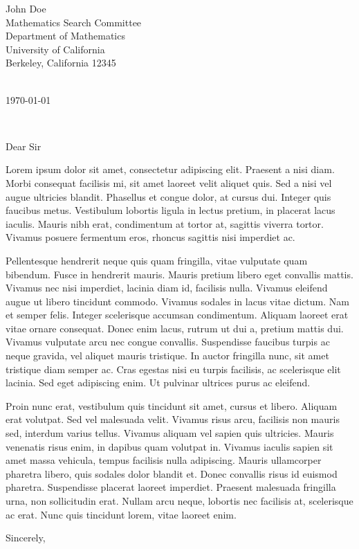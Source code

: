 \documentclass[11pt,a4paper]{letter}
\def\opening#1{\thispagestyle{empty}
{\centering\fromaddress \vspace{0.6in} \\ 
\hspace*{\longindentation}\today\hspace*{\fill}\par} 
{\raggedright \toname \\ \toaddress \par} 
\vspace{0.4in} 
\noindent #1 
}
\begin{document}

\begin{letter}
{John Doe\\
Mathematics Search Committee\\
Department of Mathematics\\
University of California\\
Berkeley, California 12345\\
}


\opening{Dear Sir}

Lorem ipsum dolor sit amet, consectetur adipiscing elit. Praesent a nisi diam. Morbi consequat facilisis mi, sit amet laoreet velit aliquet quis. Sed a nisi vel augue ultricies blandit. Phasellus et congue dolor, at cursus dui. Integer quis faucibus metus. Vestibulum lobortis ligula in lectus pretium, in placerat lacus iaculis. Mauris nibh erat, condimentum at tortor at, sagittis viverra tortor. Vivamus posuere fermentum eros, rhoncus sagittis nisi imperdiet ac.

Pellentesque hendrerit neque quis quam fringilla, vitae vulputate quam bibendum. Fusce in hendrerit mauris. Mauris pretium libero eget convallis mattis. Vivamus nec nisi imperdiet, lacinia diam id, facilisis nulla. Vivamus eleifend augue ut libero tincidunt commodo. Vivamus sodales in lacus vitae dictum. Nam et semper felis. Integer scelerisque accumsan condimentum. Aliquam laoreet erat vitae ornare consequat. Donec enim lacus, rutrum ut dui a, pretium mattis dui. Vivamus vulputate arcu nec congue convallis. Suspendisse faucibus turpis ac neque gravida, vel aliquet mauris tristique. In auctor fringilla nunc, sit amet tristique diam semper ac. Cras egestas nisi eu turpis facilisis, ac scelerisque elit lacinia. Sed eget adipiscing enim. Ut pulvinar ultrices purus ac eleifend.

Proin nunc erat, vestibulum quis tincidunt sit amet, cursus et libero. Aliquam erat volutpat. Sed vel malesuada velit. Vivamus risus arcu, facilisis non mauris sed, interdum varius tellus. Vivamus aliquam vel sapien quis ultricies. Mauris venenatis risus enim, in dapibus quam volutpat in. Vivamus iaculis sapien sit amet massa vehicula, tempus facilisis nulla adipiscing. Mauris ullamcorper pharetra libero, quis sodales dolor blandit et. Donec convallis risus id euismod pharetra. Suspendisse placerat laoreet imperdiet. Praesent malesuada fringilla urna, non sollicitudin erat. Nullam arcu neque, lobortis nec facilisis at, scelerisque ac erat. Nunc quis tincidunt lorem, vitae laoreet enim.

\closing{Sincerely,}


\end{letter}
\end{document}
